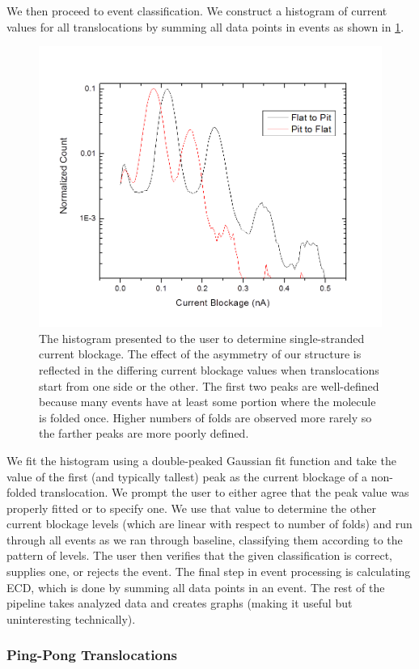 \documentclass[aps,prl,preprint,groupedaddress]{revtex4}
\begin{document}
We then proceed to event classification.
We construct a histogram of current values for all translocations by summing all data points in events as shown in \ref{fig:blockage-histogram}.
\begin{figure}[H]
\centering
\includegraphics[width=.8\textwidth]{figures/blockage-histogram}
\caption{The histogram presented to the user to determine single-stranded current blockage.
The effect of the asymmetry of our structure is reflected in the differing current blockage values when translocations start from one side or the other.
The first two peaks are well-defined because many events have at least some portion where the molecule is folded once.
Higher numbers of folds are observed more rarely so the farther peaks are more poorly defined.}
\label{fig:blockage-histogram}
\end{figure}
We fit the histogram using a double-peaked Gaussian fit function and take the value of the first (and typically tallest) peak as the current blockage of a non-folded translocation.
We prompt the user to either agree that the peak value was properly fitted or to specify one.
We use that value to determine the other current blockage levels (which are linear with respect to number of folds) and run through all events as we ran through baseline, classifying them according to the pattern of levels.
The user then verifies that the given classification is correct, supplies one, or rejects the event.
The final step in event processing is calculating ECD, which is done by summing all data points in an event.
The rest of the pipeline takes analyzed data and creates graphs (making it useful but uninteresting technically).


\subsubsection{Ping-Pong Translocations}
\end{document}
